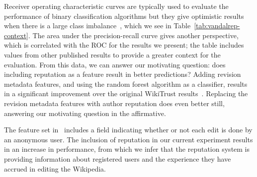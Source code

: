 Receiver operating characteristic curves are typically used to evaluate
the performance of binary classification algorithms but they give
optimistic results when there is a large class
imbalance~\cite{DavisGoadrich2006}, which we see in
Table~\ref{tab:vandalrep-context}.
The area under the precision-recall curve gives another perspective,
which is correlated with the ROC for the results we present; the table
includes values from other published results to provide a greater
context for the evaluation.
From this data, we can answer our motivating question: does including
reputation as a feature result in better predictions?
Adding revision metadata features, and using the random forest
algorithm as a classifier, results in a significant improvement over the
original WikiTrust results~\cite{Adler2010b}.
Replacing the revision metadata features with author reputation does even better still,
answering our motivating question in the affirmative.


The feature set in~\cite{Adler2010b} includes a field indicating whether
or not each edit is done by an anonymous user.
The inclusion of reputation in our current experiment results in an
increase in performance, from which we infer that the reputation system
is providing information about registered users and the experience they
have accrued in editing the Wikipedia.
